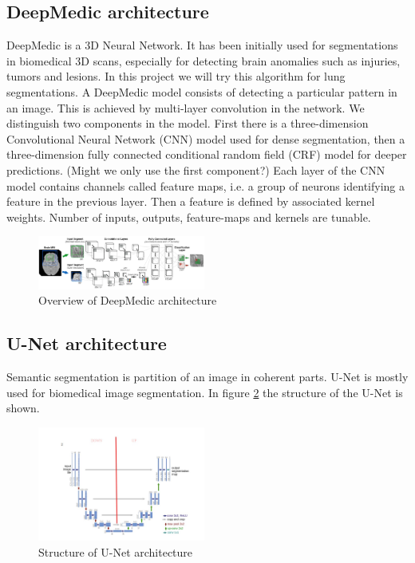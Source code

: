 \subsection{DeepMedic architecture}
DeepMedic is a 3D Neural Network. It has been initially used for segmentations in biomedical 3D scans, especially for detecting brain anomalies such as injuries, tumors and lesions. In this project we will try this algorithm for lung segmentations. \newline 
A DeepMedic model consists of detecting a particular pattern in an image. This is achieved by multi-layer convolution in the network. We distinguish two components in the model. First there is a three-dimension Convolutional Neural Network (CNN) model used for dense segmentation, then  a three-dimension fully connected conditional random field (CRF) model for deeper predictions. (Might we only use the first component?) \newline
Each layer of the CNN model contains channels called feature maps, i.e. a group of neurons identifying a feature in the previous layer. Then a feature is defined by associated kernel weights. Number of inputs, outputs, feature-maps and kernels are tunable.

\begin{figure}[h!]
	\includegraphics[width=0.49\textwidth, angle=0]{files/deepmedic.png}
	\caption{ Overview of DeepMedic architecture}
	\label{deepmedic}
\end{figure}

\subsection{U-Net architecture}
Semantic segmentation is partition of an image in coherent parts. U-Net is mostly used for biomedical image segmentation. In figure \ref{unetstructure} the structure of the U-Net is shown.\newline

\begin{figure}[h!]
	\includegraphics[width=0.49\textwidth, angle=0]{files/unetstructure.jpg}
	\caption{Structure of U-Net architecture}
	\label{unetstructure}
\end{figure}


